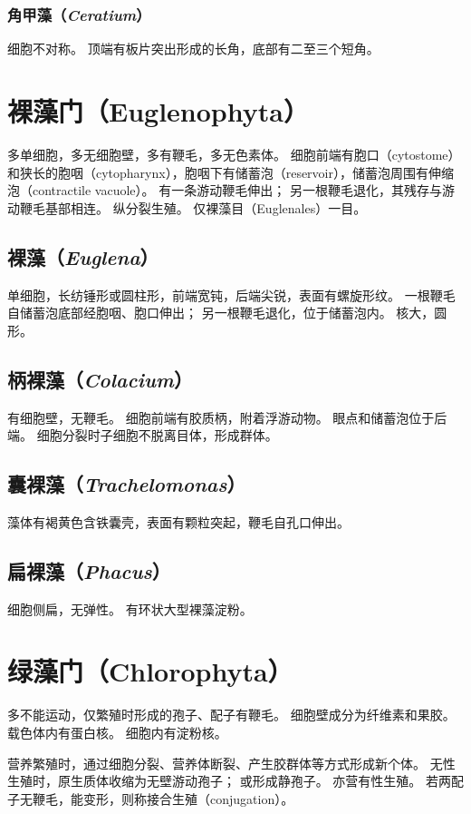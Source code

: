 \documentclass[11pt]{article}
\begin{document}
\subsubsection{角甲藻（\textit{Ceratium}）}
细胞不对称。
顶端有板片突出形成的长角，底部有二至三个短角。

\section{裸藻门（Euglenophyta）}
多单细胞，多无细胞壁，多有鞭毛，多无色素体。
细胞前端有胞口（cytostome）和狭长的胞咽（cytopharynx），胞咽下有储蓄泡（reservoir），储蓄泡周围有伸缩泡（contractile vacuole）。
有一条游动鞭毛伸出；
另一根鞭毛退化，其残存与游动鞭毛基部相连。
纵分裂生殖。
仅裸藻目（Euglenales）一目。

\subsection{裸藻（\textit{Euglena}）}
单细胞，长纺锤形或圆柱形，前端宽钝，后端尖锐，表面有螺旋形纹。
一根鞭毛自储蓄泡底部经胞咽、胞口伸出；
另一根鞭毛退化，位于储蓄泡内。
核大，圆形。

\subsection{柄裸藻（\textit{Colacium}）}
有细胞壁，无鞭毛。
细胞前端有胶质柄，附着浮游动物。
眼点和储蓄泡位于后端。
细胞分裂时子细胞不脱离目体，形成群体。

\subsection{囊裸藻（\textit{Trachelomonas}）}
藻体有褐黄色含铁囊壳，表面有颗粒突起，鞭毛自孔口伸出。

\subsection{扁裸藻（\textit{Phacus}）}
细胞侧扁，无弹性。
有环状大型裸藻淀粉。

\section{绿藻门（Chlorophyta）}
多不能运动，仅繁殖时形成的孢子、配子有鞭毛。
细胞壁成分为纤维素和果胶。
载色体内有蛋白核。
细胞内有淀粉核。

\newline

营养繁殖时，通过细胞分裂、营养体断裂、产生胶群体等方式形成新个体。
无性生殖时，原生质体收缩为无壁游动孢子；
或形成静孢子。
亦营有性生殖。
若两配子无鞭毛，能变形，则称接合生殖（conjugation）。
\end{document}
